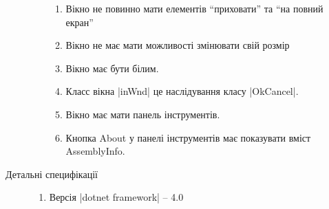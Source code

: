 \begin{description}
\begin{enumerate}
\begin{enumerate}
					\item Вікно не повинно мати елементів \enquote{приховати} та \enquote{на повний екран}
					\item Вікно не має мати можливості змінювати свій розмір
					\item Вікно має бути білим.
					\item Класс вікна \textinline|inWnd| це наслідування класу \textinline|OkCancel|.
					\item Вікно має мати панель інструментів.
					\item Кнопка About у панелі інструментів має показувати вміст AssemblyInfo.
				\end{enumerate}
		\end{enumerate}
	\item[Детальні специфікації]\directenv%
		\begin{enumerate}
			\item Версія \textinline|dotnet framework| -- 4.0
		\end{enumerate}
\end{description}
